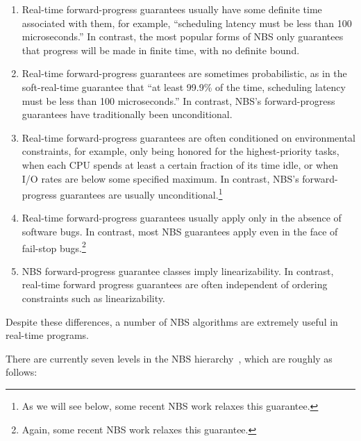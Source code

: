 \begin{enumerate}
\item	Real-time forward-progress guarantees usually have some
	definite time associated with them, for example,
	``scheduling latency must be less than 100 microseconds.''
	In contrast, the most popular forms of NBS only guarantees
	that progress will be made in finite time, with no definite
	bound.
\item	Real-time forward-progress guarantees are sometimes
	probabilistic, as in the soft-real-time guarantee that
	``at least 99.9\% of the time, scheduling latency must
	be less than 100 microseconds.''
	In contrast, NBS's forward-progress
	guarantees have traditionally been unconditional.
\item	Real-time forward-progress guarantees are often conditioned on
	environmental constraints, for example, only being honored
	for the highest-priority tasks, when each CPU spends at least
	a certain fraction of its time idle, or when I/O rates are
	below some specified maximum.
	In contrast, NBS's forward-progress
	guarantees are usually unconditional.\footnote{
		As we will see below, some recent NBS work relaxes
		this guarantee.}
\item	Real-time forward-progress guarantees usually apply only
	in the absence of software bugs.
	In contrast, most NBS guarantees apply even in the face of
	fail-stop bugs.\footnote{
		Again, some recent NBS work relaxes this guarantee.}
\item	NBS forward-progress guarantee classes imply linearizability.
	In contrast, real-time forward progress guarantees are often
	independent of ordering constraints such as linearizability.
\end{enumerate}

Despite these differences, a number of NBS algorithms are extremely
useful in real-time programs.

There are currently seven levels in the NBS
hierarchy~\cite{DanAlitarh2013PracticalProgress}, which are roughly
as follows:

